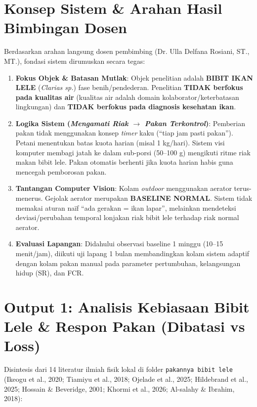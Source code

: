 \documentclass[10pt,a4paper]{article}
\begin{document}
\section{Konsep Sistem \& Arahan Hasil Bimbingan Dosen}
Berdasarkan arahan langsung dosen pembimbing (Dr. Ulla Delfana Rosiani, ST., MT.), fondasi sistem dirumuskan secara tegas:
\begin{enumerate}[leftmargin=*,itemsep=0.5pt,topsep=1.5pt]
    \item \textbf{Fokus Objek \& Batasan Mutlak}: Objek penelitian adalah \textbf{BIBIT IKAN LELE} (\textit{Clarias sp.}) fase benih/pendederan. Penelitian \textbf{TIDAK berfokus pada kualitas air} (kualitas air adalah domain kolaborator/keterbatasan lingkungan) dan \textbf{TIDAK berfokus pada diagnosis kesehatan ikan}.
    \item \textbf{Logika Sistem (\textit{Mengamati Riak $\to$ Pakan Terkontrol})}: Pemberian pakan tidak menggunakan konsep \textit{timer} kaku (``tiap jam pasti pakan''). Petani menentukan batas kuota harian (misal 1 kg/hari). Sistem visi komputer membagi jatah ke dalam sub-porsi (50--100 g) mengikuti ritme riak makan bibit lele. Pakan otomatis berhenti jika kuota harian habis guna mencegah pemborosan pakan.
    \item \textbf{Tantangan Computer Vision}: Kolam \textit{outdoor} menggunakan aerator terus-menerus. Gejolak aerator merupakan \textbf{BASELINE NORMAL}. Sistem tidak memakai aturan naïf ``ada gerakan = ikan lapar'', melainkan mendeteksi deviasi/perubahan temporal lonjakan riak bibit lele terhadap riak normal aerator.
    \item \textbf{Evaluasi Lapangan}: Didahului observasi baseline 1 minggu (10--15 menit/jam), diikuti uji lapang 1 bulan membandingkan kolam sistem adaptif dengan kolam pakan manual pada parameter pertumbuhan, kelangsungan hidup (SR), dan FCR.
\end{enumerate}

\section{Output 1: Analisis Kebiasaan Bibit Lele \& Respon Pakan (Dibatasi vs Loss)}
Disintesis dari 14 literatur ilmiah fisik lokal di folder \texttt{pakannya bibit lele} (Ikeogu et al., 2020; Tiamiyu et al., 2018; Ojelade et al., 2025; Hildebrand et al., 2025; Hossain \& Beveridge, 2001; Khormi et al., 2026; Al-salahy \& Ibrahim, 2018):
\end{document}
